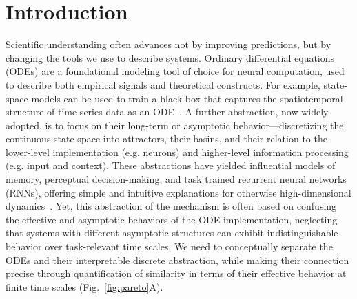 \documentclass{article}
\theoremstyle{definition} \newtheorem{definition}{Definition}  \newtheorem{example}{Example}
\theoremstyle{remark} \newtheorem{remark}{Remark}
\newcounter{ct}
\begin{document}
\section{Introduction}\label{sec:intro}
Scientific understanding often advances not by improving predictions, but by changing the tools we use to describe systems.
Ordinary differential equations (ODEs) are a foundational modeling tool of choice for neural computation, used to describe both empirical signals and theoretical constructs.
For example, state-space models can be used to train a black-box that captures the spatiotemporal structure of time series data as an ODE~\citep{nair2023approximate,pei2neural,Dowling2024b}.
A further abstraction, now widely adopted, is to focus on their long-term or asymptotic behavior---discretizing the continuous state space into attractors, their basins, and their relation to the lower-level implementation (e.g. neurons) and higher-level information processing (e.g. input and context).
These abstractions have yielded influential models of memory\citep{machens2008ca}, perceptual decision-making\citep{mante2013context}, and task trained recurrent neural networks (RNNs)\citep{driscoll2024flexible}, offering simple and intuitive explanations for otherwise high-dimensional dynamics~\citep{vyas2020ctd,versteeg2025computation}.
Yet, this abstraction of the mechanism is often based on confusing the effective and asymptotic behaviors of the ODE implementation, neglecting that systems with different asymptotic structures can exhibit indistinguishable behavior over task-relevant time scales.
We need to conceptually separate the ODEs and their interpretable discrete abstraction, while making their connection precise through quantification of similarity in terms of their effective behavior at finite time scales (Fig.~\ref{fig:pareto}A).

\end{document}
